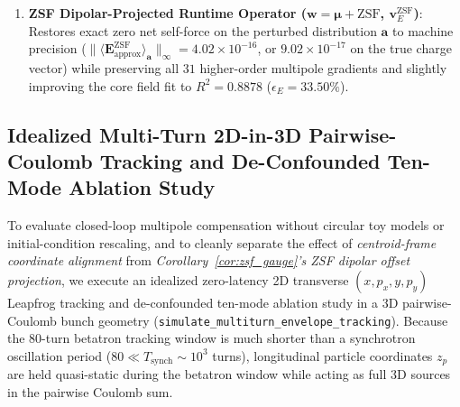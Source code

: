 \documentclass[11pt,a4paper]{article}
\begin{document}
\begin{itemize}
\begin{enumerate}
        \item \textbf{ZSF Dipolar-Projected Runtime Operator ($\bm{w}=\bm{\mu} + \mathrm{ZSF}$, $\bm{v}_E^{\mathrm{ZSF}}$)}: Restores exact zero net self-force on the perturbed distribution $\bm{a}$ to machine precision ($\|\langle \bm{E}_{\mathrm{approx}}^{\mathrm{ZSF}}\rangle_{\bm{a}}\|_\infty = 4.02 \times 10^{-16}$, or $9.02 \times 10^{-17}$ on the true charge vector) while preserving all $31$ higher-order multipole gradients and slightly improving the core field fit to $R^2 = 0.8878$ ($\epsilon_E = 33.50\%$).
    \end{enumerate}
\end{itemize}

\subsection{Idealized Multi-Turn 2D-in-3D Pairwise-Coulomb Tracking and De-Confounded Ten-Mode Ablation Study}
To evaluate closed-loop multipole compensation without circular toy models or initial-condition rescaling, and to cleanly separate the effect of \emph{centroid-frame coordinate alignment} from \emph{Corollary~\ref{cor:zsf_gauge}'s ZSF dipolar offset projection}, we execute an idealized zero-latency 2D transverse $(x, p_x, y, p_y)$ Leapfrog tracking and de-confounded ten-mode ablation study in a 3D pairwise-Coulomb bunch geometry (\texttt{simulate\_\allowbreak multiturn\_\allowbreak envelope\_\allowbreak tracking}). Because the $80$-turn betatron tracking window is much shorter than a synchrotron oscillation period ($80 \ll T_{\mathrm{synch}} \sim 10^3$ turns), longitudinal particle coordinates $z_p$ are held quasi-static during the betatron window while acting as full 3D sources in the pairwise Coulomb sum.
\end{document}
